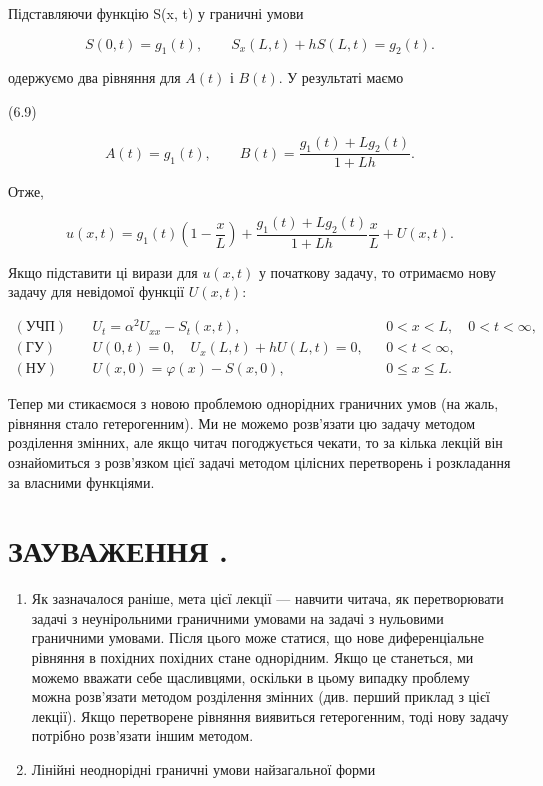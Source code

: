 \documentclass[
  ukrainian,
]{article}
\begin{document}
Підставляючи функцію S(x, t) у граничні умови

\[
S(0, t)=g_1(t), \qquad S_x(L, t)+hS(L, t)=g_2(t).
\]

одержуємо два рівняння для \(A(t)\) і \(B(t)\). У результаті маємо

(6.9)

\[
A(t)=g_1(t), \qquad B(t)=\frac{g_1(t)+Lg_2(t)}{1+Lh}.
\]

Отже,

\[
u(x, t)=g_1(t)\left(1-\frac{x}{L}\right)+\frac{g_1(t)+Lg_2(t)}{1+Lh}\frac{x}{L}+U(x, t).
\]

Якщо підставити ці вирази для \(u(x,t)\) у початкову задачу, то
отримаємо нову задачу для невідомої функції \(U(x,t)\):

\[
\begin{aligned}
(\text{УЧП})\quad & U_t = \alpha^2 U_{xx} - S_t(x,t), && 0 < x < L,\quad 0 < t < \infty, \\
(\text{ГУ})\quad & U(0,t) = 0,\quad U_x(L,t) + hU(L,t) = 0, && 0 < t < \infty, \\
(\text{НУ})\quad & U(x,0) = \varphi(x) - S(x,0), && 0 \leqslant x \leqslant L.
\end{aligned}
\]

Тепер ми стикаємося з новою проблемою однорідних граничних умов (на
жаль, рівняння стало гетерогенним). Ми не можемо розв'язати цю задачу
методом розділення змінних, але якщо читач погоджується чекати, то за
кілька лекцій він ознайомиться з розв'язком цієї задачі методом цілісних
перетворень і розкладання за власними функціями.

\section{ЗАУВАЖЕННЯ
.}\label{ux437ux430ux443ux432ux430ux436ux435ux43dux43dux44f-.}

\begin{enumerate}
\def\labelenumi{\arabic{enumi}.}
\item
  Як зазначалося раніше, мета цієї лекції --- навчити читача, як
  перетворювати задачі з неунірольними граничними умовами на задачі з
  нульовими граничними умовами. Після цього може статися, що нове
  диференціальне рівняння в похідних похідних стане однорідним. Якщо це
  станеться, ми можемо вважати себе щасливцями, оскільки в цьому випадку
  проблему можна розв'язати методом розділення змінних (див. перший
  приклад з цієї лекції). Якщо перетворене рівняння виявиться
  гетерогенним, тоді нову задачу потрібно розв'язати іншим методом.
\item
  Лінійні неоднорідні граничні умови найзагальної форми
\end{enumerate}
\end{document}
